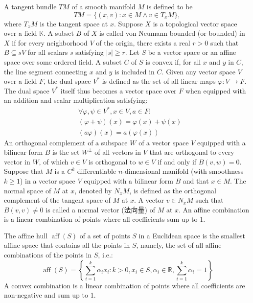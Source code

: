 \documentclass[a4paper,12pt]{article}
\begin{document}
A tangent bundle $TM$ of a smooth manifold $M$ is defined to be
\[TM=\{(x,v)\colon x\in M\land v\in T_xM\},\]
where $T_xM$ is the tangent space at $x$.
Suppose $X$ is a topological vector space over a field $\mathbb{K}$. A subset $B$ of $X$ is called von Neumann bounded (or bounded) in $X$ if for every neighborhood $V$ of the origin, there exists a real $r>0$ such that $B\subseteq sV$ for all scalars $s$ satisfying $|s|\geq r$.
Let $S$ be a vector space or an affine space over some ordered field. A subset $C$ of $S$ is convex if, for all $x$ and $y$ in $C$, the line segment connecting $x$ and $y$ is included in $C$.
Given any vector space $V$ over a field $F$, the dual space $V^*$ is defined as the set of all linear maps $\varphi\colon V\to F$. The dual space $V^*$ itself thus becomes a vector space over $F$ when equipped with an addition and scalar multiplication satisfying:
\[\begin{aligned}
&\forall\varphi ,\psi \in V^*,x\in V,a\in F:\\
&(\varphi+\psi)(x)=\varphi (x)+\psi (x)\\
&(a\varphi )(x)=a\left(\varphi (x)\right)
\end{aligned}\]
An orthogonal complement of a subspace $W$ of a vector space $V$ equipped with a bilinear form $B$ is the set $W^{\perp }$ of all vectors in $V$ that are orthogonal to every vector in $W$, of which $v\in V$ is orthogonal to $w\in V$ if and only if $B(v,w)=0$.
Suppose that $M$ is a $C^k$ differentiable $n$-dimensional manifold (with smoothness $k\geq 1$) in a vector space $V$ equipped with a bilinear form $B$ and that $x\in M$. The normal space of $M$ at $x$, denoted by $N_xM$, is defined as the orthogonal complement of the tangent space of $M$ at $x$. A vector $v\in N_xM$ such that $B(v,v)\neq 0$ is called a normal vector (法向量) of $M$ at $x$.
An affine combination is a linear combination of points where all coefficients sum up to 1.

The affine hull $\operatorname{aff} (S)$ of a set of points $S$ in a Euclidean space is the smallest affine space that contains all the points in $S$, namely, the set of all affine combinations of the points in $S$, i.e.:
\[\operatorname{aff}(S)=\left\{\sum _{i=1}^k\alpha _ix_i\colon k>0,x_i\in S,\alpha _i\in\mathbb{R},\sum _{i=1}^k\alpha _i=1\right\}\]
A convex combination is a linear combination of points where all coefficients are non-negative and sum up to 1.
\end{document}

